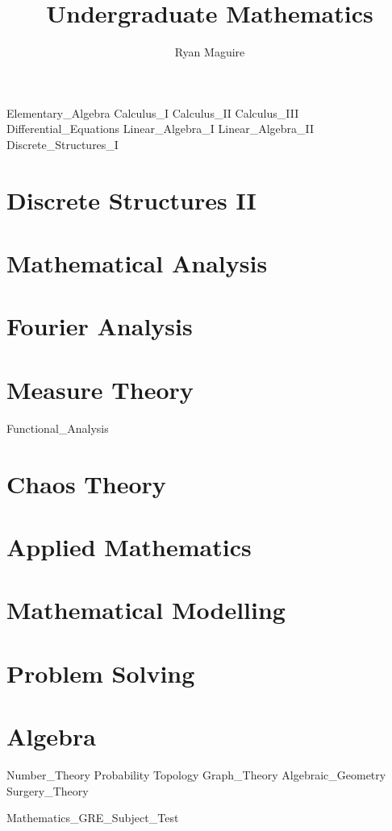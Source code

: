 \documentclass[crop=false,class=book,oneside]{standalone}
\begin{document}
    \newif\ifmathcourses
    \ifx\ifcourses\undefined
        \title{Undergraduate Mathematics}
        \author{Ryan Maguire}
        \date{\vspace{-5ex}}
        \maketitle
        \tableofcontents
        \listoffigures
        \listoftables
        \clearpage
    \fi
    {Elementary_Algebra}
    {Calculus_I}
    {Calculus_II}
    {Calculus_III}
    {Differential_Equations}
    {Linear_Algebra_I}
    {Linear_Algebra_II}
    {Discrete_Structures_I}
    \chapter{Discrete Structures II}
    \chapter{Mathematical Analysis}
    \chapter{Fourier Analysis}
    \chapter{Measure Theory}
    {Functional_Analysis}
    \chapter{Chaos Theory}
    \chapter{Applied Mathematics}
    \chapter{Mathematical Modelling}
    \chapter{Problem Solving}
    \chapter{Algebra}
    {Number_Theory}
    {Probability}
    {Topology}
    {Graph_Theory}
    {Algebraic_Geometry}
    {Surgery_Theory}
    
              {Mathematics_GRE_Subject_Test}
\end{document}
